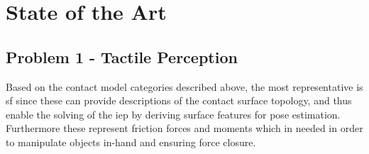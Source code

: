 \chapter{State of the Art}\label{ch:state-of-the-art}

\section{Problem 1 - Tactile Perception}\label{sec:lit-rev-problem-1}

Based on the contact model categories described above, the most representative is \gls{sf} since these can provide descriptions of the contact surface topology, and thus enable the solving of the \gls{iep} by deriving surface features for pose estimation. Furthermore these represent friction forces and moments which in needed in order to manipulate objects in-hand and ensuring force closure.\medskip



